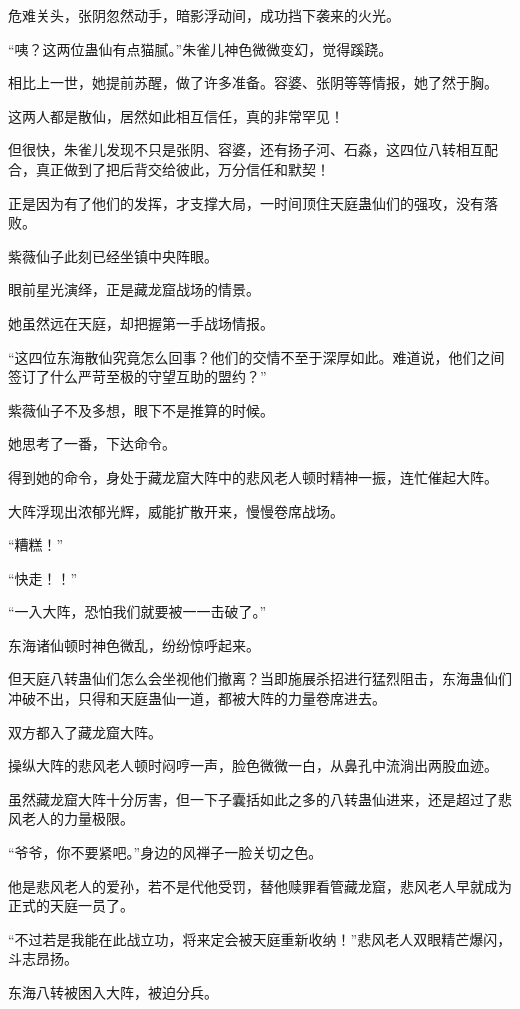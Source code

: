 \begin{this_body}
危难关头，张阴忽然动手，暗影浮动间，成功挡下袭来的火光。

“咦？这两位蛊仙有点猫腻。”朱雀儿神色微微变幻，觉得蹊跷。

相比上一世，她提前苏醒，做了许多准备。容婆、张阴等等情报，她了然于胸。

这两人都是散仙，居然如此相互信任，真的非常罕见！

但很快，朱雀儿发现不只是张阴、容婆，还有扬子河、石淼，这四位八转相互配合，真正做到了把后背交给彼此，万分信任和默契！

正是因为有了他们的发挥，才支撑大局，一时间顶住天庭蛊仙们的强攻，没有落败。

紫薇仙子此刻已经坐镇中央阵眼。

眼前星光演绎，正是藏龙窟战场的情景。

她虽然远在天庭，却把握第一手战场情报。

“这四位东海散仙究竟怎么回事？他们的交情不至于深厚如此。难道说，他们之间签订了什么严苛至极的守望互助的盟约？”

紫薇仙子不及多想，眼下不是推算的时候。

她思考了一番，下达命令。

得到她的命令，身处于藏龙窟大阵中的悲风老人顿时精神一振，连忙催起大阵。

大阵浮现出浓郁光辉，威能扩散开来，慢慢卷席战场。

“糟糕！”

“快走！！”

“一入大阵，恐怕我们就要被一一击破了。”

东海诸仙顿时神色微乱，纷纷惊呼起来。

但天庭八转蛊仙们怎么会坐视他们撤离？当即施展杀招进行猛烈阻击，东海蛊仙们冲破不出，只得和天庭蛊仙一道，都被大阵的力量卷席进去。

双方都入了藏龙窟大阵。

操纵大阵的悲风老人顿时闷哼一声，脸色微微一白，从鼻孔中流淌出两股血迹。

虽然藏龙窟大阵十分厉害，但一下子囊括如此之多的八转蛊仙进来，还是超过了悲风老人的力量极限。

“爷爷，你不要紧吧。”身边的风禅子一脸关切之色。

他是悲风老人的爱孙，若不是代他受罚，替他赎罪看管藏龙窟，悲风老人早就成为正式的天庭一员了。

“不过若是我能在此战立功，将来定会被天庭重新收纳！”悲风老人双眼精芒爆闪，斗志昂扬。

东海八转被困入大阵，被迫分兵。


\end{this_body}
